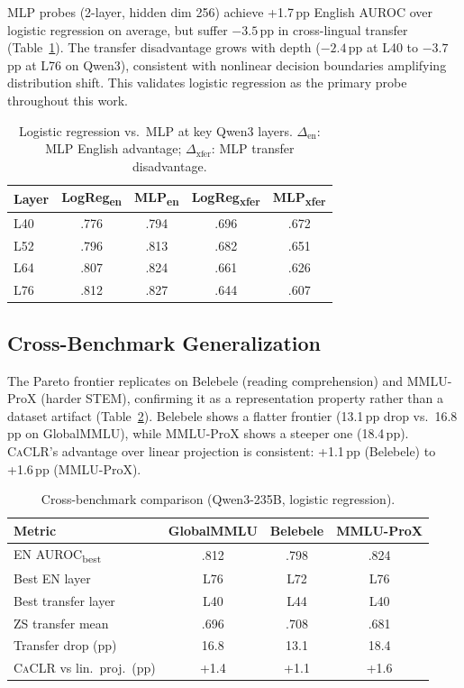 \documentclass[11pt,a4paper]{article}
\newcommand{\caclr}{\textsc{CaCLR}}
\begin{document}
MLP probes (2-layer, hidden dim 256) achieve +1.7\,pp English AUROC over logistic regression on average, but suffer $-3.5$\,pp in cross-lingual transfer (Table~\ref{tab:probe_complexity}).
The transfer disadvantage grows with depth ($-2.4$\,pp at L40 to $-3.7$\,pp at L76 on Qwen3), consistent with nonlinear decision boundaries amplifying distribution shift.
This validates logistic regression as the primary probe throughout this work.

\begin{table}[t]
\centering
\small
\caption{Logistic regression vs.\ MLP at key Qwen3 layers. $\Delta_{\text{en}}$: MLP English advantage; $\Delta_{\text{xfer}}$: MLP transfer disadvantage.}
\label{tab:probe_complexity}
\begin{tabular}{lcccc}
\toprule
Layer & LogReg\textsubscript{en} & MLP\textsubscript{en} & LogReg\textsubscript{xfer} & MLP\textsubscript{xfer} \\
\midrule
L40 & .776 & .794 & .696 & .672 \\
L52 & .796 & .813 & .682 & .651 \\
L64 & .807 & .824 & .661 & .626 \\
L76 & .812 & .827 & .644 & .607 \\
\bottomrule
\end{tabular}
\end{table}

\subsection{Cross-Benchmark Generalization}

The Pareto frontier replicates on Belebele (reading comprehension) and MMLU-ProX (harder STEM), confirming it as a representation property rather than a dataset artifact (Table~\ref{tab:cross_benchmark}).
Belebele shows a flatter frontier (13.1\,pp drop vs.\ 16.8\,pp on GlobalMMLU), while MMLU-ProX shows a steeper one (18.4\,pp).
\caclr{}'s advantage over linear projection is consistent: +1.1\,pp (Belebele) to +1.6\,pp (MMLU-ProX).

\begin{table}[t]
\centering
\small
\caption{Cross-benchmark comparison (Qwen3-235B, logistic regression).}
\label{tab:cross_benchmark}
\begin{tabular}{lccc}
\toprule
Metric & GlobalMMLU & Belebele & MMLU-ProX \\
\midrule
EN AUROC\textsubscript{best} & .812 & .798 & .824 \\
Best EN layer & L76 & L72 & L76 \\
Best transfer layer & L40 & L44 & L40 \\
ZS transfer mean & .696 & .708 & .681 \\
Transfer drop (pp) & 16.8 & 13.1 & 18.4 \\
\caclr{} vs lin.\ proj.\ (pp) & +1.4 & +1.1 & +1.6 \\
\bottomrule
\end{tabular}
\end{table}
\end{document}
